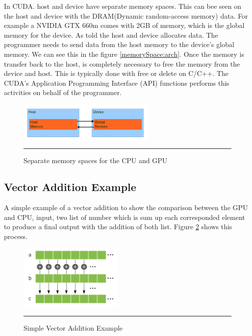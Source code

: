 In CUDA. host and device have separate memory spaces. This can bee seen on the host and device with the DRAM(Dynamic random-access memory) data. For example a NVIDIA GTX 660m comes with 2GB of memory, which is the global memory for the device. As told the host and device allocates data. The programmer needs to send data from the host memory to the device's global memory. We can see this in the figure  \ref{memorySpace:arch}.  Once the memory is transfer back to the host, is completely necessary to free the memory from the device and host. This is typically done with free or delete on C/C++. The CUDA's Application Programming Interface (API) functions performs this activities on behalf of the programmer.   \cite{hwu}

\begin{figure}[htbp]
	\centering
		\includegraphics[width=0.6\textwidth]{Figures/memorySpace.png}
		\rule{35em}{0.5pt}
	\caption[Memory Space GPU and CPU]{Separate memory spaces for the CPU and GPU}
	\label{fig:memorySpace}
\end{figure}

\subsection{Vector Addition Example}

A simple example of a vector addition to show the comparison between the GPU and CPU, input, two list of number which is sum up each corresponded element to produce a final output with the addition of both list. Figure \ref{fig:sum} shows this process. \cite{example}

\begin{figure}[htbp]
	\centering
		\includegraphics[width=0.45\textwidth]{Figures/sum.png}
		\rule{35em}{0.3pt}
	\caption[Vector Addition Example]{Simple Vector Addition Example}
	\label{fig:sum}
\end{figure}

